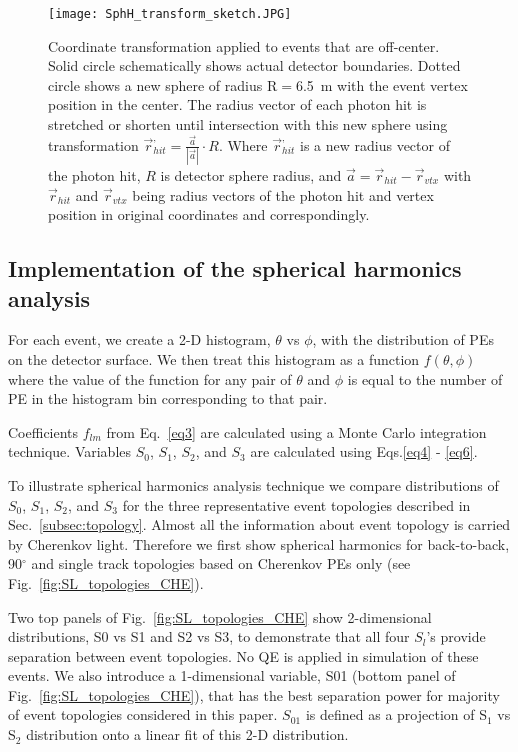 \begin{figure*}[h]
  \centering
  \texttt{[image: SphH\_transform\_sketch.JPG]}
  \caption{Coordinate transformation applied to events that are
    off-center. Solid circle schematically shows actual detector
    boundaries. Dotted circle shows a new sphere of radius R$=$6.5~m
    with the event vertex position in the center. The radius vector of
    each photon hit is stretched or shorten until intersection with
    this new sphere using transformation $\vec{r}^{,}_{hit} =
    \frac{\vec{a}}{|\vec{a}|} \cdot R$. Where $\vec{r}^{,}_{hit}$ is a
    new radius vector of the photon hit, $R$ is detector sphere radius,
    and $\vec{a}=\vec{r}_{hit} - \vec{r}_{vtx}$ with $\vec{r}_{hit}$
    and $\vec{r}_{vtx}$ being radius vectors of the photon hit and
    vertex position in original coordinates and correspondingly.}
  \label{fig:SphH_transform}
\end{figure*}


\subsection{Implementation of the spherical harmonics analysis}

For each event, we create a 2-D histogram, $\theta$ vs $\phi$, with the distribution of PEs on the detector surface. We then treat this histogram as a function $f(\theta,\phi)$ where the value of the function for any pair of $\theta$ and $\phi$ is equal to the number of PE in the histogram bin corresponding to that pair.

Coefficients $f_{lm}$ from Eq.~\ref{eq3} are calculated using a Monte Carlo integration technique. Variables $S_0$, $S_1$, $S_2$, and $S_3$ are calculated using Eqs.\ref{eq4} - \ref{eq6}.

To illustrate spherical harmonics analysis technique we compare distributions of $S_0$, $S_1$, $S_2$, and $S_3$ for the three representative event topologies described in Sec.~\ref{subsec:topology}. Almost all the information about event topology is carried by Cherenkov light. Therefore we first show spherical harmonics for back-to-back,  90$^{\circ}$ and single track topologies based on Cherenkov PEs only (see Fig.~\ref{fig:SL_topologies_CHE}).

Two top panels of Fig.~\ref{fig:SL_topologies_CHE} show 2-dimensional distributions, S0 vs S1 and S2 vs S3, to demonstrate that all four $S_l$'s provide separation between event topologies. No QE is applied in simulation of these events. We also introduce a 1-dimensional variable, S01 (bottom panel of Fig.~\ref{fig:SL_topologies_CHE}), that has the best separation power for majority of event topologies considered in this paper. $S_{01}$ is defined as a projection of S$_1$ vs S$_2$ distribution onto a linear fit of this 2-D distribution.


